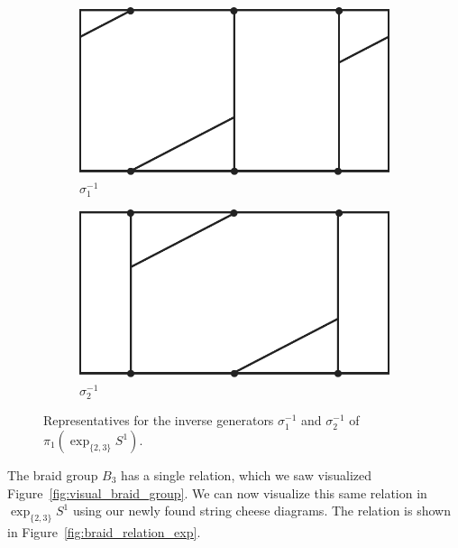 \documentclass[12pt,twoside]{reedthesis}
\theoremstyle{definition}
\newcommand{\exptwothree}{\exp_{\{2,3\}}}
\begin{document}
\begin{figure}[h]
  \centering
  \begin{subfigure}[t]{0.23\textwidth}
    \centering
    \includegraphics[width=\textwidth]{figures/braid_gen_a_inv.pdf}
    \caption{$\sigma_1^{-1}$}
  \end{subfigure}
  \hspace{5mm}
  \begin{subfigure}[t]{0.23\textwidth}
    \centering
    \includegraphics[width=\textwidth]{figures/braid_gen_b_inv.pdf}
    \caption{$\sigma_2^{-1}$}
  \end{subfigure}
  \caption{Representatives for the inverse generators $\sigma_1^{-1}$ and $\sigma_2^{-1}$ of $\pi_1(\exptwothree S^1)$.}
  \label{fig:braid_gen_invs_exp}
\end{figure}

The braid group $B_3$ has a single relation, which we saw visualized Figure~\ref{fig:visual_braid_group}.
We can now visualize this same relation in $\exptwothree S^1$ using our newly found string cheese diagrams.
The relation is shown in Figure~\ref{fig:braid_relation_exp}.
\end{document}
